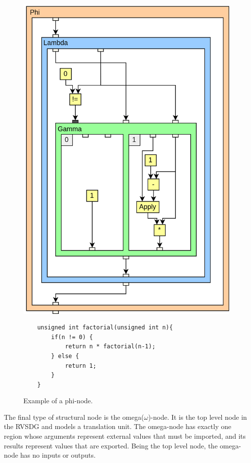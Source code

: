 \begin{figure}[H]
    \centering
    \includegraphics[width=\textwidth/5]{Images/phi-node-example.png}
    \begin{verbatim}
    unsigned int factorial(unsigned int n){
        if(n != 0) {
            return n * factorial(n-1);
        } else {
            return 1;
        }
    }
    \end{verbatim}
    \caption{Example of a phi-node.}
    \label{fig:RVSDG_phi_node}
\end{figure}


\label{lbl:omega-node}
The final type of structural node is the omega($\omega$)-node. It is the top level node in the RVSDG and models a translation unit. The omega-node has exactly one region whose arguments represent external values that must be imported, and its results represent values that are exported. Being the top level node, the omega-node has no inputs or outputs.




